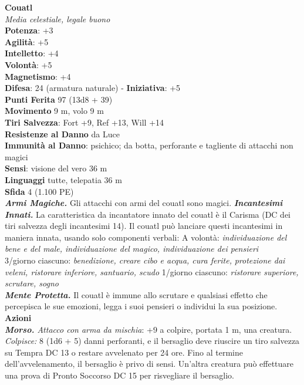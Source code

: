 \begin{multicols}{2}
\medskip\textbf{Couatl}\\
\emph{Media celestiale, legale buono}\\
\textbf{Potenza}: +3\\
\textbf{Agilità}: +5\\
\textbf{Intelletto}: +4\\
\textbf{Volontà}: +5\\
\textbf{Magnetismo}: +4\\
\textbf{Difesa}: 24 (armatura naturale) - \textbf{Iniziativa}: +5\\
\textbf{Punti Ferita} 97 (13d8 + 39)\\
\textbf{Movimento} 9 m, volo 9 m\\
\textbf{Tiri Salvezza}: Fort +9, Ref +13, Will +14\\
\textbf{Resistenze al Danno} da Luce\\
\textbf{Immunità al Danno}: psichico; da botta, perforante e tagliente di attacchi non magici\\
\textbf{Sensi}: visione del vero 36 m\\
\textbf{Linguaggi} tutte, telepatia 36 m \\
\textbf{Sfida} 4 (1.100 PE)\smallskip\\
\emph{\textbf{Armi Magiche.}} Gli attacchi con armi del couatl sono magici.
\emph{\textbf{Incantesimi Innati.}} La caratteristica da incantatore innato del couatl è il Carisma (DC dei tiri salvezza degli incantesimi 14). Il couatl può lanciare questi incantesimi in maniera innata, usando solo componenti verbali:
A volontà: \emph{individuazione del bene e del male, individuazione del} \emph{magico, individuazione dei pensieri}\\
3/giorno ciascuno: \emph{benedizione, creare cibo e acqua, cura ferite,} \emph{protezione dai veleni, ristorare inferiore, santuario, scudo} 1/giorno ciascuno: \emph{ristorare superiore, scrutare, sogno}\\
\emph{\textbf{Mente Protetta.}} Il couatl è immune allo scrutare e qualsiasi effetto che percepisca le sue emozioni, legga i suoi pensieri o individui la sua posizione.\\
\smallskip\textbf{Azioni}\\
\emph{\textbf{Morso.} Attacco con arma da mischia}: +9 a colpire, portata 1 m, una creatura.\\
\emph{Colpisce:} 8 (1d6 + 5) danni perforanti, e il bersaglio deve riuscire un tiro salvezza su Tempra DC 13 o restare avvelenato per 24 ore. Fino al termine dell'avvelenamento, il bersaglio è privo di sensi. Un'altra creatura può effettuare una prova di Pronto Soccorso DC 15 per risvegliare il bersaglio.\\

\end{multicols}
